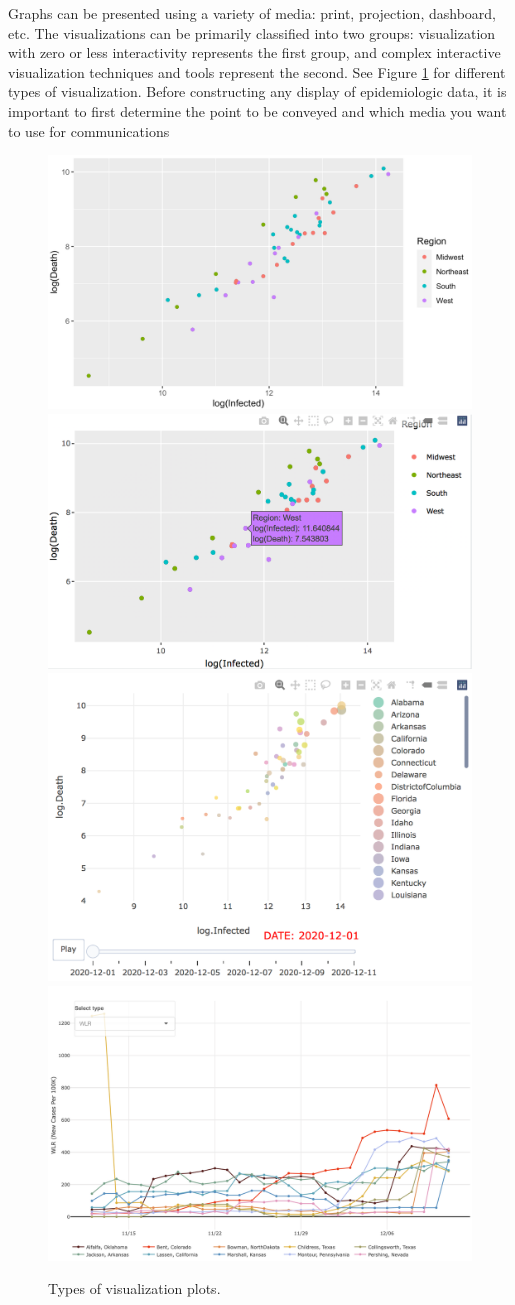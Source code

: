 \documentclass[]{book}
\begin{document}
Graphs can be presented using a variety of media: print, projection,
dashboard, etc. The visualizations can be primarily classified into two
groups: visualization with zero or less interactivity represents the
first group, and complex interactive visualization techniques and tools
represent the second. See Figure \ref{fig:plottypes} for different types
of visualization. Before constructing any display of epidemiologic data,
it is important to first determine the point to be conveyed and which
media you want to use for communications

\begin{figure}

{\centering \includegraphics[width=0.4\linewidth]{figures/static_plot} \includegraphics[width=0.4\linewidth]{figures/plotly_plot} \includegraphics[width=0.4\linewidth]{figures/animation2} \includegraphics[width=0.4\linewidth]{figures/county_risk_ts} 

}

\caption{Types of visualization plots.}\label{fig:plottypes}
\end{figure}
\end{document}
